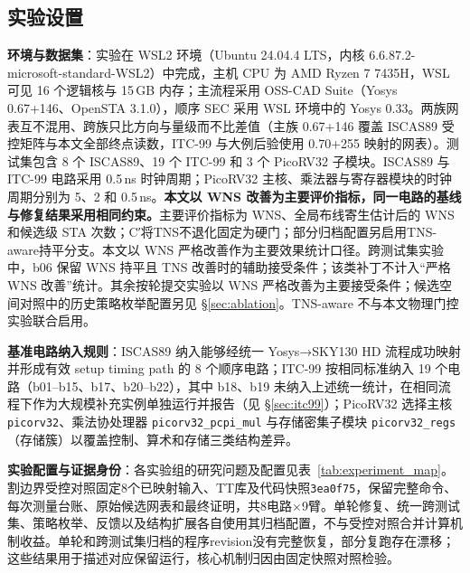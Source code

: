\documentclass[twocolumn,10pt,fontset=windows]{ctexart}
\begin{document}
\subsection{实验设置}\label{sec:setup}

\textbf{环境与数据集}：实验在 WSL2 环境（Ubuntu 24.04.4 LTS，内核 6.6.87.2-microsoft-standard-WSL2）中完成，主机 CPU 为 AMD Ryzen 7 7435H，WSL 可见 16 个逻辑核与 15\,GB 内存；主流程采用 OSS-CAD Suite（Yosys 0.67+146、OpenSTA 3.1.0），顺序 SEC 采用 WSL 环境中的 Yosys 0.33。两族网表互不混用、跨族只比方向与量级而不比差值（主族 0.67+146 覆盖 ISCAS89 受控矩阵与本文全部终点读数，ITC-99 与大例后验使用 0.70+255 映射的网表）。测试集包含 8 个 ISCAS89、19 个 ITC-99 和 3 个 PicoRV32 子模块。ISCAS89 与 ITC-99 电路采用 0.5\,ns 时钟周期；PicoRV32 主核、乘法器与寄存器模块的时钟周期分别为 5、2 和 0.5\,ns。\textbf{本文以 WNS 改善为主要评价指标，同一电路的基线与修复结果采用相同约束。}主要评价指标为 WNS、全局布线寄生估计后的 WNS 和候选级 STA 次数；C′将TNS不退化固定为硬门；部分归档配置另启用TNS-aware持平分支。本文以 WNS 严格改善作为主要效果统计口径。跨测试集实验中，b06 保留 WNS 持平且 TNS 改善时的辅助接受条件；该类补丁不计入“严格 WNS 改善”统计。其余按轮提交实验以 WNS 严格改善为主要接受条件；候选空间对照中的历史策略枚举配置另见 \S\ref{sec:ablation}。TNS-aware 不与本文物理门控实验联合启用。

\textbf{基准电路纳入规则}：ISCAS89 纳入能够经统一 Yosys→SKY130 HD 流程成功映射并形成有效 setup timing path 的 8 个顺序电路；ITC-99 按相同标准纳入 19 个电路（b01--b15、b17、b20--b22），其中 b18、b19 未纳入上述统一统计，在相同流程下作为大规模补充实例单独运行并报告（见 \S\ref{sec:itc99}）；PicoRV32 选择主核 \texttt{picorv32}、乘法协处理器 \texttt{picorv32\_pcpi\_mul} 与存储密集子模块 \texttt{picorv32\_regs}（存储簇）以覆盖控制、算术和存储三类结构差异。

\textbf{实验配置与证据身份}：各实验组的研究问题及配置见表~\ref{tab:experiment_map}。割边界受控对照固定8个已映射输入、TT库及代码快照\texttt{3ea0f75}，保留完整命令、每次测量台账、原始候选网表和最终证明，共8电路$\times$9臂。单轮修复、统一跨测试集、策略枚举、反馈以及结构扩展各自使用其归档配置，不与受控对照合并计算机制收益。单轮和跨测试集归档的程序revision没有完整恢复，部分复跑存在漂移；这些结果用于描述对应保留运行，核心机制归因由固定快照对照检验。
\end{document}
